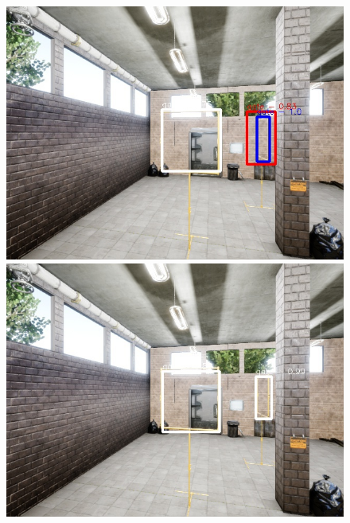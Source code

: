 \documentclass{article}
\begin{document}
\begin{figure}
	\centering
	\begin{minipage}{0.45\linewidth}
		\includegraphics[width=\linewidth]{fig/example1_gate}
	\end{minipage}
	\begin{minipage}{0.45\linewidth}
		\includegraphics[width=\linewidth]{fig/example1_yolo}
	\end{minipage}
	

\end{figure}
\end{document}
